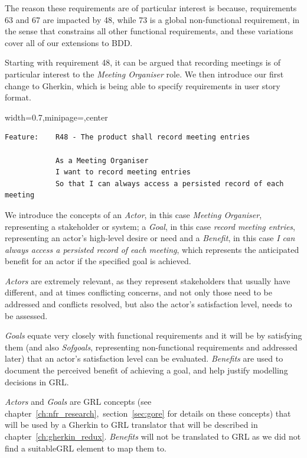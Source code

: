 \documentclass[dissertation,final]{softeng}
\newenvironment{featurecode}[1]
{ \lrbox\featurebox \begin{adjustbox}{width=#1\textwidth,minipage=\textwidth,center} }
{ \end{adjustbox}\endlrbox}
\newenvironment{featurelist}[2]
{
\newcommand{\setcaption}{\caption{#1}}
\newcommand{\setlabel}{\label{#2}}
}
{\begin{listing}[h!]\centering\usebox\featurebox\setcaption\setlabel\end{listing}}
\begin{document}
The reason these requirements are of particular interest is because, requirements 63 and 67 are impacted by 48, while 73 is a global non-functional requirement, in the sense that constrains all other functional requirements, and these variations cover all of our extensions to BDD.

Starting with requirement 48, it can be argued that recording meetings is of particular interest to the \emph{Meeting Organiser} role. We then introduce our first change to Gherkin, which is being able to specify requirements in user story format.

\begin{featurelist}{Changes to Gherkin -- User story format}{lst:gherkin_changes_userstory}
\begin{featurecode}{0.7}
\begin{verbatim}
Feature:    R48 - The product shall record meeting entries

            As a Meeting Organiser
            I want to record meeting entries
            So that I can always access a persisted record of each meeting
\end{verbatim}
\end{featurecode}
\end{featurelist}

We introduce the concepts of an \emph{Actor}, in this case \emph{Meeting Organiser}, representing a stakeholder or system; a \emph{Goal}, in this case \emph{record meeting entries}, representing an actor's high-level desire or need and a \emph{Benefit}, in this case \emph{I can always access a persisted record of each meeting}, which represents the anticipated benefit for an actor if the specified goal is achieved.

\emph{Actors} are extremely relevant, as they represent stakeholders that usually have different, and at times conflicting concerns, and not only those need to be addressed and conflicts resolved, but also the actor's satisfaction level, needs to be assessed.

\emph{Goals} equate very closely with functional requirements and it will be by satisfying them (and also \emph{Sofgoals}, representing non-functional requirements and addressed later) that an actor's satisfaction level can be evaluated. \emph{Benefits} are used to document the perceived benefit of achieving a goal, and help justify modelling decisions in GRL.

\emph{Actors} and \emph{Goals} are GRL concepts (see chapter~\ref{ch:nfr_research},~section~\ref{sec:gore} for details on these concepts) that will be used by a Gherkin to GRL translator that will be described in chapter~\ref{ch:gherkin_redux}. \emph{Benefits} will not be translated to GRL as we did not find a suitableGRL element to map them to.
\end{document}

